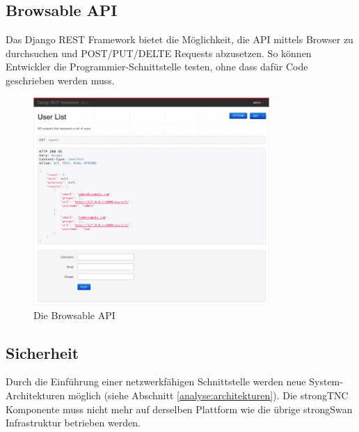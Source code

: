 \subsection{Browsable API}

Das Django REST Framework bietet die Möglichkeit, die API mittels Browser zu
durchsuchen und POST/PUT/DELTE Requests abzusetzen. So können Entwickler die
Programmier-Schnittstelle testen, ohne dass dafür Code geschrieben werden muss.

\begin{figure}[H]
	\centering
	\includegraphics[width=0.8\textwidth]{images/drf-browsable}
	\caption{Die Browsable API}
\end{figure}

\subsection{Sicherheit}

Durch die Einführung einer netzwerkfähigen Schnittstelle werden neue
System-Architekturen möglich (siehe Abschnitt \ref{analyse:architekturen}). Die
strongTNC Komponente muss nicht mehr auf derselben Plattform wie die übrige
strongSwan Infrastruktur betrieben werden.

